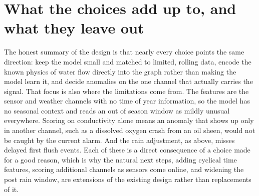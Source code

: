 \documentclass[11pt]{article}
\begin{document}
\section*{What the choices add up to, and what they leave out}

The honest summary of the design is that nearly every choice points the same direction: keep the model small and matched to limited, rolling data, encode the known physics of water flow directly into the graph rather than making the model learn it, and decide anomalies on the one channel that actually carries the signal. That focus is also where the limitations come from. The features are the sensor and weather channels with no time of year information, so the model has no seasonal context and reads an out of season window as mildly unusual everywhere. Scoring on conductivity alone means an anomaly that shows up only in another channel, such as a dissolved oxygen crash from an oil sheen, would not be caught by the current alarm. And the rain adjustment, as above, misses delayed first flush events. Each of these is a direct consequence of a choice made for a good reason, which is why the natural next steps, adding cyclical time features, scoring additional channels as sensors come online, and widening the post rain window, are extensions of the existing design rather than replacements of it.
\end{document}
